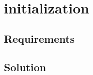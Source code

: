 \section{initialization}
\label{design:initialization}
\subsection{Requirements}


\subsection{Solution}